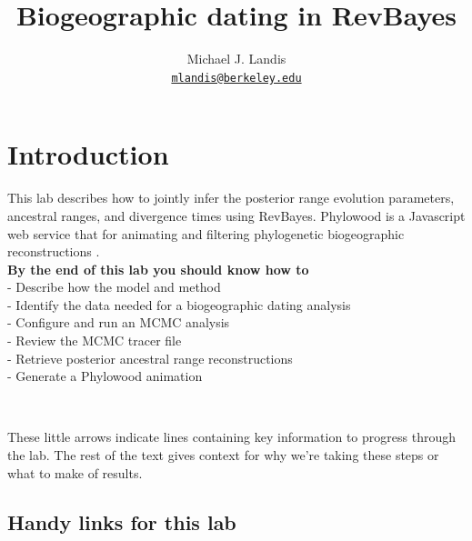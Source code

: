 \documentclass[11pt]{article}
\newcommand{\impmark}{\strut\vadjust{\domark}}
\newcommand{\domark}{%
  \vbox to 0pt{
    \kern-\dp\strutbox
    \smash{\llap{$\rightarrow$\kern1em}}
    \vss
  }%
}
\begin{document}


\title{Biogeographic dating in RevBayes}
\author{Michael J. Landis \\ \href{mailto:mlandis@berkeley.edu}{\texttt{mlandis@berkeley.edu}}}
\maketitle

\section{Introduction}

This lab describes how to jointly infer the posterior range evolution parameters, ancestral ranges, and divergence times using RevBayes.
Phylowood is a Javascript web service that for animating and filtering phylogenetic biogeographic reconstructions \citep{landis14}. \\

\noindent \textbf{By the end of this lab you should know how to} \\
- Describe how the model and method \\
- Identify the data needed for a biogeographic dating analysis \\
- Configure and run an MCMC analysis \\
- Review the MCMC tracer file \\
- Retrieve posterior ancestral range reconstructions \\
- Generate a Phylowood animation

\noindent \\ \impmark These little arrows indicate lines containing key information to progress through the lab. The rest of the text gives context for why we're taking these steps or what to make of results.

\subsection{Handy links for this lab}
\end{document}
